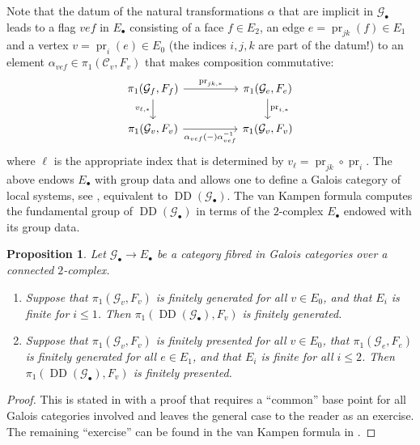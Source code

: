 \documentclass[a4paper,twoside,11pt,reqno]{amsart}
\newcommand{\cC}{{\mathcal C}}
\newcommand{\cG}{{\mathcal G}}
\DeclareMathOperator{\pr}{pr}
\DeclareMathOperator{\Desc}{DD}
\newtheorem{prop}[thm]{Proposition}
\theoremstyle{definition}
\numberwithin{equation}{subsection}
\begin{document}
Note that the datum of the natural transformations $\alpha$ that are implicit in $\cG_\bullet$ leads to a flag $vef$ in $E_\bullet$ consisting of a face $f \in E_2$, an edge $e = \pr_{jk}(f) \in E_1$ and a vertex $v = \pr_i(e) \in E_0$ (the indices $i,j,k$ are part of the datum!) to an element $\alpha_{vef} \in \pi_1(\cC_v,F_v)$ that makes composition commutative:
\[
\begin{tikzcd}
\pi_1(\cG_f,F_f) \ar[rr,"\pr_{jk,\ast}"] \ar[d,"v_{\ell,\ast}",swap] && \pi_1(\cG_e,F_e) \ar[d,"\pr_{i,\ast}"] \\
\pi_1(\cG_v,F_v) \ar[rr,"\alpha_{vef}(-)\alpha_{vef}^{-1}",swap] && \pi_1(\cG_v,F_v)
\end{tikzcd}
\]
where $\ell$ is the appropriate index that is determined by $v_\ell = \pr_{jk} \circ \pr_i$.
The above endows $E_\bullet$ with group data and allows one to define a Galois category of local systems, see \cite[\S4.3]{Stix2006:vanKampen}, equivalent to $\Desc(\cG_\bullet)$. The van Kampen formula 
\cite[Corollary~3.3]{Stix2006:vanKampen} computes the fundamental group of  $\Desc(\cG_\bullet)$ in terms of the $2$-complex $E_\bullet$ endowed with its group data. 

\begin{prop}
\label{prop:DD-fgfp}
    Let $\cG_\bullet \to E_\bullet$ be a category fibred in Galois categories over a connected $2$-complex. 
    \begin{enumerate}[ref=(\arabic*)]
        \item
        \label{propitem:DD-fg}
        Suppose that $\pi_1(\cG_v,F_v)$ is  finitely generated for all $v \in E_0$, and that $E_i$ is finite for $i \leq 1$. 
        Then $\pi_1(\Desc(\cG_\bullet),F_v)$ is finitely generated.
        \item
        \label{propitem:DD-fp}
        Suppose that $\pi_1(\cG_v,F_v)$ is finitely presented for all $v \in E_0$, that $\pi_1(\cG_e,F_e)$ is  finitely generated for all $e \in E_1$, and that $E_i$ is finite for all $i \leq 2$.
        Then $\pi_1(\Desc(\cG_\bullet),F_v)$ is finitely presented.
    \end{enumerate}
\end{prop}
\begin{proof}
This is stated in \cite[IX Corollaire~5.2,~5.3]{SGA1} with a proof that requires a ``common'' base point for all Galois categories involved and leaves the general case to the reader as an exercise. The remaining ``exercise'' can be found in the van Kampen formula in \cite[Corollary~3.3]{Stix2006:vanKampen}.  
\end{proof}
\end{document}
